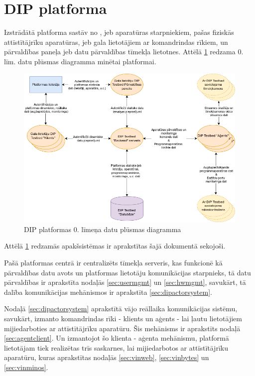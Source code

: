 \section{DIP platforma}
\label{sec:dipplatform}

Izstrādātā platforma sastāv no , 
jeb aparatūras starpniekiem, pašas fiziskās attīstītājrīku aparatūras,
 jeb gala lietotājiem ar komandrindas rīkiem, un
pārvaldības paneļa jeb datu pārvaldības tīmekļa lietotnes. Attēlā
\ref{fig:dipdpd0} redzama 0. līm. datu plūsmas diagramma minētai platformai. 

\begin{figure}[H]
    \includegraphics[width=0.7\linewidth]{assets/DPD0.drawio.png}
    \centering
    \caption{DIP platformas 0. līmeņa datu plūsmas diagramma}
    \label{fig:dipdpd0}
\end{figure}

Attēlā \ref{fig:dipdpd0} redzamās apakšsistēmas ir aprakstītas šajā dokumentā
sekojoši. 

Pašā platformas centrā ir centralizēts tīmekļa serveris, kas funkcionē
kā pārvaldības datu avots un platformas lietotāju komunikācijas starpnieks, tā
datu pārvaldības ir aprakstīta nodaļās \ref{sec:usermgmt} un \ref{sec:hwmgmt},
savukārt, tā dalība komunikācijas mehānismos ir aprakstīta \ref{sec:dipactorsystem}.

Nodaļā \ref{sec:dipactorsystem} aprakstītā vājo reāllaika komunikācijas sistēmu,
savukārt, izmanto komandrindas rīki - klients un aģents - lai ļautu lietotājiem
mijiedarboties ar attīstītājrīku aparatūru. Šis mehānisms ir aprakstīts nodaļā
\ref{sec:agentclient}. Un izmantojot šo klienta - aģenta mehānismu, platformā
lietotājam tiek realizētas trīs saskarnes, lai mijiedarbotos ar attīstītājrīku
aparatūru, kuras aprakstītas nodaļās \ref{sec:vinweb}, \ref{sec:vinbytes} un
\ref{sec:vinminos}.

